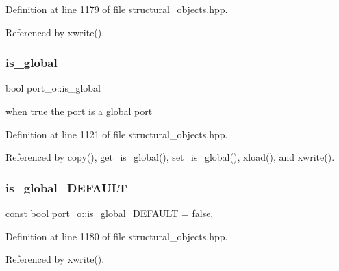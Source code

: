 Definition at line 1179 of file structural\+\_\+objects.\+hpp.



Referenced by xwrite().

\mbox{\label{structport__o_a3a9f7bf7636a11fa50f05316a5f6891b}} 
\subsubsection{\texorpdfstring{is\+\_\+global}{is\_global}}
{\footnotesize\ttfamily bool port\+\_\+o\+::is\+\_\+global\hspace{0.3cm}{\ttfamily [private]}}



when true the port is a global port 



Definition at line 1121 of file structural\+\_\+objects.\+hpp.



Referenced by copy(), get\+\_\+is\+\_\+global(), set\+\_\+is\+\_\+global(), xload(), and xwrite().

\mbox{\label{structport__o_a5dde0b106a5b155bbbdc82987edb0750}} 
\subsubsection{\texorpdfstring{is\+\_\+global\+\_\+\+D\+E\+F\+A\+U\+LT}{is\_global\_DEFAULT}}
{\footnotesize\ttfamily const bool port\+\_\+o\+::is\+\_\+global\+\_\+\+D\+E\+F\+A\+U\+LT = false\hspace{0.3cm}{\ttfamily [static]}, {\ttfamily [private]}}



Definition at line 1180 of file structural\+\_\+objects.\+hpp.



Referenced by xwrite().

\mbox{\label{structport__o_a4a808b723b089dd912e89c4db297f739}} 
